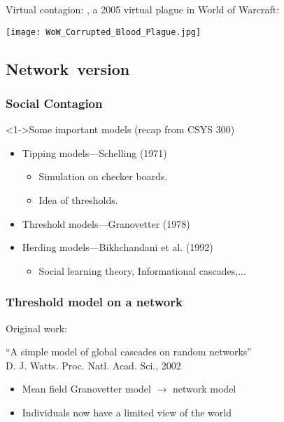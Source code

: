 \begin{frame}
  Virtual contagion:
  ,
  a 2005 virtual plague in World of Warcraft:
  
  \begin{center}
    \texttt{[image: WoW\_Corrupted\_Blood\_Plague.jpg]}
  \end{center}

\end{frame}

\subsection{Network\ version}

\begin{frame}
  \frametitle{Social Contagion}

  \begin{block}<1->{Some important models (recap from CSYS 300)}
    \begin{itemize}
    \item<1-> Tipping models---Schelling (1971)\cite{schelling1971a,schelling1973a,schelling1978a}
      \begin{itemize}
      \item<2->
        Simulation on checker boards.
      \item<3->
        Idea of thresholds.
      \end{itemize}
    \item<4-> Threshold models---Granovetter (1978)\cite{granovetter1978a}
    \item<5-> Herding models---Bikhchandani et al. (1992)\cite{bikhchandani1992a,bikhchandani1998a}
      \begin{itemize}
      \item<6->
        Social learning theory, Informational cascades,...
      \end{itemize}
    \end{itemize}
  \end{block}

\end{frame}

\begin{frame}
  \frametitle{Threshold model on a network}

  Original work:

  \bigskip

  \alert{``A simple model of global cascades on random networks''}\\
  D. J. Watts.  Proc. Natl. Acad. Sci., 2002\cite{watts2002a}

  \bigskip

  \begin{itemize}
  \item<2-> Mean field Granovetter model $\rightarrow$ network model
  \item<3-> Individuals now have a limited view of the world
  \end{itemize}

\end{frame}

